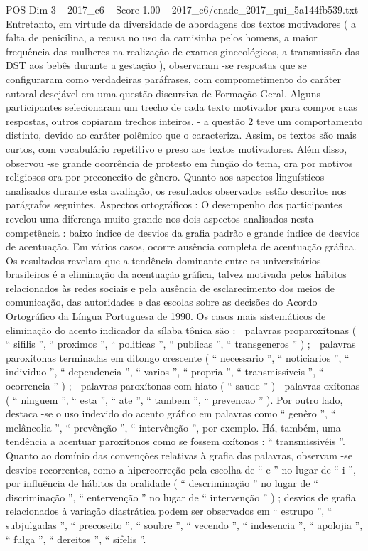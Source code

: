 \begin{textsample}{POS Dim 3 – 2017\_c6 – Score 1.00 – 2017\_c6/enade\_2017\_qui\_5a144fb539.txt}
Entretanto, em virtude da diversidade de abordagens dos textos motivadores ( a falta de penicilina, a recusa no uso da camisinha pelos homens, a maior frequência das mulheres na realização de exames ginecológicos, a transmissão das DST aos bebês durante a gestação ), observaram -se respostas que se configuraram como verdadeiras paráfrases, com comprometimento do caráter autoral desejável em uma questão discursiva de Formação Geral.
Alguns participantes selecionaram um trecho de cada texto motivador para compor suas respostas, outros copiaram trechos inteiros. - a questão 2 teve um comportamento distinto, devido ao caráter polêmico que o caracteriza.
Assim, os textos são mais curtos, com vocabulário repetitivo e preso aos textos motivadores.
Além disso, observou -se grande ocorrência de protesto em função do tema, ora por motivos religiosos ora por preconceito de gênero.
Quanto aos aspectos linguísticos analisados durante esta avaliação, os resultados observados estão descritos nos parágrafos seguintes.
Aspectos ortográficos : O desempenho dos participantes revelou uma diferença muito grande nos dois aspectos analisados nesta competência : baixo índice de desvios da grafia padrão e grande índice de desvios de acentuação.
Em vários casos, ocorre ausência completa de acentuação gráfica.
Os resultados revelam que a tendência dominante entre os universitários brasileiros é a eliminação da acentuação gráfica, talvez motivada pelos hábitos relacionados às redes sociais e pela ausência de esclarecimento dos meios de comunicação, das autoridades e das escolas sobre as decisões do Acordo Ortográfico da Língua Portuguesa de 1990.
Os casos mais sistemáticos de eliminação do acento indicador da sílaba tônica são :  palavras proparoxítonas ( “ sifilis ”, “ proximos ”, “ politicas ”, “ publicas ”, “ transgeneros ” ) ;  palavras paroxítonas terminadas em ditongo crescente ( “ necessario ”, “ noticiarios ”, “ individuo ”, “ dependencia ”, “ varios ”, “ propria ”, “ transmissiveis ”, “ ocorrencia ” ) ;  palavras paroxítonas com hiato ( “ saude ” )  palavras oxítonas ( “ ninguem ”, “ esta ”, “ ate ”, “ tambem ”, “ prevencao ” ).
Por outro lado, destaca -se o uso indevido do acento gráfico em palavras como “ genêro ”, “ melâncolia ”, “ prevênção ”, “ intervênção ”, por exemplo.
Há, também, uma tendência a acentuar paroxítonos como se fossem oxítonos : “ transmissivéis ”.
Quanto ao domínio das convenções relativas à grafia das palavras, observam -se desvios recorrentes, como a hipercorreção pela escolha de “ e ” no lugar de “ i ”, por influência de hábitos da oralidade ( “ descriminação ” no lugar de “ discriminação ”, “ entervenção ” no lugar de “ intervenção ” ) ; desvios de grafia relacionados à variação diastrática podem ser observados em “ estrupo ”, “ subjulgadas ”, “ precoseito ”, “ soubre ”, “ vecendo ”, “ indesencia ”, “ apolojia ”, “ fulga ”, “ dereitos ”, “ sifelis ”.

\end{textsample}
